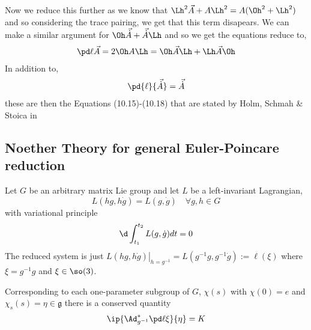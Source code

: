 Now we reduce this further as we know that $\Lh^2\vec A + A\Lh^2 = A(\Oh^2 + \Lh^2)$ and so considering the trace pairing, we get that this term disapears. We can make a similar argument for $\Oh\vec{\dot A} + \vec{\dot A}\Lh$ and so we get the equations reduce to,
\begin{align}
  \pd \ell {\vec A} = 2\Oh A\Lh = \Oh\vec A\Lh + \Lh\vec A\Oh
\end{align}
In addition to,
\begin{align}
  \pd{\ell}{\vec{\dot A}} = \vec{\dot A}
\end{align}
these are then the Equations (10.15)-(10.18) that are stated by Holm, Schmah \& Stoica in \cite{holm_schmah_stoica_2009}
\subsection{Noether Theory for general Euler-Poincare reduction}
Let $G$ be an arbitrary matrix Lie group and let $L$ be a left-invariant Lagrangian,
$$ L(hg, h\dot g) = L(g, \dot g) \quad \forall g, h \in G$$
with variational principle
$$ \d \int_{t_1}^{t_2} L(g, \dot g)dt = 0 $$
The reduced system is just $\left.L(hg, h\dot g)\right|_{h = g^{-1}} = L(g^{-1}g, g^{-1}\dot g) := \ell(\xi)$ where $\xi = g^{-1}g$ and $\xi \in \so(3)$.
\begin{nthm}
  Corresponding to each one-parameter subgroup of $G$, $\chi(s)$ with $\chi(0) = e$ and $\chi_s (s) = \eta \in \mathfrak{g}$ there is a conserved quantity
  $$ \ip{\Ad^*_{g^{-1}} \pd \ell \xi}{\eta} = K $$
\end{nthm}
